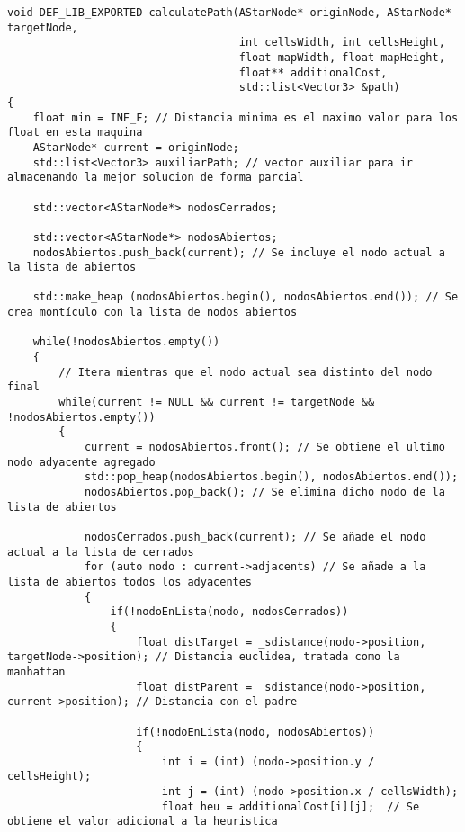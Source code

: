 \lstset{language=C++, texcl=true}
\begin{lstlisting}[frame=single]
void DEF_LIB_EXPORTED calculatePath(AStarNode* originNode, AStarNode* targetNode,
                                    int cellsWidth, int cellsHeight,
                                    float mapWidth, float mapHeight,
                                    float** additionalCost,
                                    std::list<Vector3> &path)
{
    float min = INF_F; // Distancia minima es el maximo valor para los float en esta maquina
    AStarNode* current = originNode;
    std::list<Vector3> auxiliarPath; // vector auxiliar para ir almacenando la mejor solucion de forma parcial
    
    std::vector<AStarNode*> nodosCerrados;
    
    std::vector<AStarNode*> nodosAbiertos;
    nodosAbiertos.push_back(current); // Se incluye el nodo actual a la lista de abiertos
    
    std::make_heap (nodosAbiertos.begin(), nodosAbiertos.end()); // Se crea montículo con la lista de nodos abiertos
    
    while(!nodosAbiertos.empty())
    {
        // Itera mientras que el nodo actual sea distinto del nodo final
        while(current != NULL && current != targetNode && !nodosAbiertos.empty())
        {
            current = nodosAbiertos.front(); // Se obtiene el ultimo nodo adyacente agregado
            std::pop_heap(nodosAbiertos.begin(), nodosAbiertos.end());
            nodosAbiertos.pop_back(); // Se elimina dicho nodo de la lista de abiertos
            
            nodosCerrados.push_back(current); // Se añade el nodo actual a la lista de cerrados
            for (auto nodo : current->adjacents) // Se añade a la lista de abiertos todos los adyacentes
            {
                if(!nodoEnLista(nodo, nodosCerrados))
                {
                    float distTarget = _sdistance(nodo->position, targetNode->position); // Distancia euclidea, tratada como la manhattan
                    float distParent = _sdistance(nodo->position, current->position); // Distancia con el padre
                    
                    if(!nodoEnLista(nodo, nodosAbiertos))
                    {
                        int i = (int) (nodo->position.y / cellsHeight);
                        int j = (int) (nodo->position.x / cellsWidth);
                        float heu = additionalCost[i][j];  // Se obtiene el valor adicional a la heuristica
                        

\end{lstlisting}
